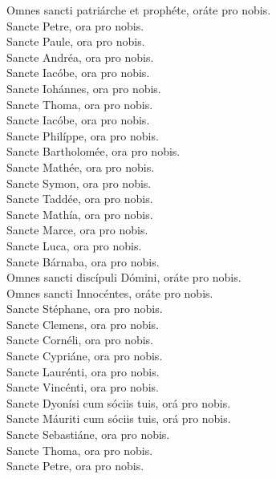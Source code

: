 {	Omnes sancti patriárche et prophéte, oráte pro nobis. \\
	Sancte Petre, ora pro nobis. \\
	Sancte Paule, ora pro nobis. \\
	Sancte Andréa, ora pro nobis. \\
	Sancte Iacóbe, ora pro nobis. \\
	Sancte Iohánnes, ora pro nobis. \\
	Sancte Thoma, ora pro nobis. \\
	Sancte Iacóbe, ora pro nobis. \\
	Sancte Philíppe, ora pro nobis. \\
	Sancte Bartholomée, ora pro nobis. \\
	Sancte Mathée, ora pro nobis. \\
	Sancte Symon, ora pro nobis. \\
	Sancte Taddée, ora pro nobis. \\
	Sancte Mathía, ora pro nobis. \\
	Sancte Marce, ora pro nobis. \\
	Sancte Luca, ora pro nobis. \\
	Sancte Bárnaba, ora pro nobis. \\
	Omnes sancti discípuli Dómini, oráte pro nobis. \\
	Omnes sancti Innocéntes, oráte pro nobis. \\
	Sancte Stéphane, ora pro nobis. \\
		Sancte Clemens, ora pro nobis. \\
		Sancte Cornéli, ora pro nobis. \\
		Sancte Cypriáne, ora pro nobis. \\
	Sancte Laurénti, ora pro nobis. \\
	Sancte Vincénti, ora pro nobis. \\
		Sancte Dyonísi cum sóciis tuis, orá pro nobis. \\
		Sancte Máuriti cum sóciis tuis, orá pro nobis. \\
		Sancte Sebastiáne, ora pro nobis. \\
		Sancte Thoma, ora pro nobis. \\
		Sancte Petre, ora pro nobis. \\
}
